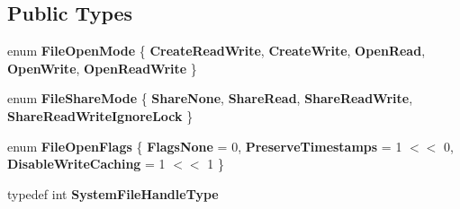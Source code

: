 \subsection*{Public Types}
\begin{DoxyCompactItemize}
\item 
\mbox{\label{class_gost_crypt_1_1_file_a6446ba56109e78b20cf1852c7f7b1145}} 
enum {\bfseries File\+Open\+Mode} \{ \newline
{\bfseries Create\+Read\+Write}, 
{\bfseries Create\+Write}, 
{\bfseries Open\+Read}, 
{\bfseries Open\+Write}, 
\newline
{\bfseries Open\+Read\+Write}
 \}
\item 
\mbox{\label{class_gost_crypt_1_1_file_a4b0f8fe96dd5b7620f826e3a0c9324b7}} 
enum {\bfseries File\+Share\+Mode} \{ {\bfseries Share\+None}, 
{\bfseries Share\+Read}, 
{\bfseries Share\+Read\+Write}, 
{\bfseries Share\+Read\+Write\+Ignore\+Lock}
 \}
\item 
\mbox{\label{class_gost_crypt_1_1_file_a744c189c46b6b7976312ed3c0b2837d4}} 
enum {\bfseries File\+Open\+Flags} \{ {\bfseries Flags\+None} = 0, 
{\bfseries Preserve\+Timestamps} = 1 $<$$<$ 0, 
{\bfseries Disable\+Write\+Caching} = 1 $<$$<$ 1
 \}
\item 
\mbox{\label{class_gost_crypt_1_1_file_acb4228d2ba1aeb7053c40c2fab0eace3}} 
typedef int {\bfseries System\+File\+Handle\+Type}
\end{DoxyCompactItemize}
